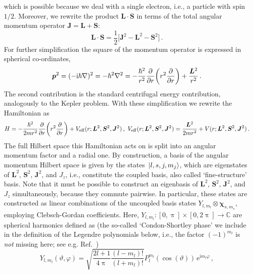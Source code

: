 \documentclass[fontsize=12pt,
               twoside=false,
               BCOR=0mm,
               DIV=14,
               overfullrule=true, %
               toc=bibliography,
               headinclude=true,
               footinclude=false]{scrartcl}
\numberwithin{equation}{section}
\newcommand{\ee}{\mathrm{e}}
\newcommand{\ii}{\mathrm{i}}
\newcommand{\pii}{\uppi}
\begin{document}
    which is possible because we deal with a single electron, i.e., a particle
    with spin $1\slash{2}$. Moreover, we rewrite the product $\bm{L}\cdot\bm{S}$
    in terms of the total angular momentum operator $\bm{J}=\bm{L}+\bm{S}$:
    \begin{equation}
        \bm{L}\cdot\bm{S}
        =
        \frac{1}{2}\big[\bm{J}^2-\bm{L}^2-\bm{S}^2\big]
    \,.
    \end{equation}
    For further simplification the square of the momentum operator is expressed
    in spherical co-ordinates,
    \begin{equation}
        \bm{p}^2
        =
        (-\ii\hbar\nabla)^2
        =
        -\hbar^2\nabla^2
        =
        -\frac{\hbar^2}{r^2}\pdv{r}(r^2\pdv{r})+\frac{\bm{L}^2}{r^2}
    \,.
    \end{equation}
    The second contribution is the standard centrifugal energy contribution,
    analogously to the Kepler problem. With these simplification we rewrite the
    Hamiltonian as
    \begin{equation}
        H
        =
        -\frac{\hbar^2}{2mr^2}\pdv{r}(r^2\pdv{r})
        +
        V_\mathrm{eff}(r;\bm{L}^2,\bm{S}^2,\bm{J}^2)
    \,, \
        V_\mathrm{eff}(r;\bm{L}^2,\bm{S}^2,\bm{J}^2)
        =
        \frac{\bm{L}^2}{2mr^2}+V(r;\bm{L}^2,\bm{S}^2,\bm{J}^2)
    \,.
    \end{equation}
    The full Hilbert space this Hamiltonian acts on is split into an angular
    momentum factor and a radial one. By construction, a basis of the angular
    momentum Hilbert space is given by the states $\ket*{l,s,j,m_j}$, which are
    eigenstates of $\bm{L}^2$, $\bm{S}^2$, $\bm{J}^2$, and $J_z$, i.e.,
    constitute the coupled basis, also called `fine-structure' basis. Note that
    it must be possible to construct an eigenbasis of $\bm{L}^2$, $\bm{S}^2$,
    $\bm{J}^2$, and $J_z$ simultaneously, because they commute pairwise. In
    particular, these states are constructed as linear combinations of the
    uncoupled basis states $Y_{l,m_l}\otimes\bm{\chi}_{s,m_s}$, employing
    Clebsch-Gordan coefficients. Here,
    $Y_{l,m_l}\colon[0,\pii]\times[0,2\pii]\to\mathbb{C}$ are spherical
    harmonics defined as (the so-called `Condon-Shortley phase' we include in
    the definition of the Legendre polynomials below, i.e., the factor
    $(-1)^{m_l}$ is \emph{not} missing here; see e.g. Ref.~\cite{friedrich2017})
    \begin{equation}\label{eq:sphericalHarmonics}
        Y_{l,m_l}(\vartheta,\varphi)
        =
        \sqrt{\frac{2l+1}{4\pii}\frac{(l-m_l)!}{(l+m_l)!}}
        P^{m_l}_l(\cos(\vartheta))\,\ee^{\ii m_l \varphi}
    \,,
    \end{equation}
\end{document}
